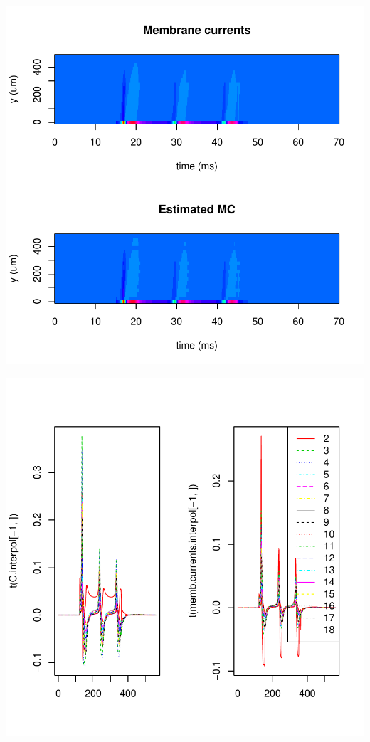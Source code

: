 \documentclass[10pt,a4paper]{report}
\begin{document}
\includegraphics{bs_1D_130506-imagemebc}



\includegraphics{bs_1D_130506-tobbiresz}
\end{document}
